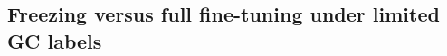 \documentclass[diagnostics,article,submit,pdftex,moreauthors]{Definitions/mdpi}
\begin{document}


\subsection{Freezing versus full fine-tuning under limited GC labels}
\end{document}
